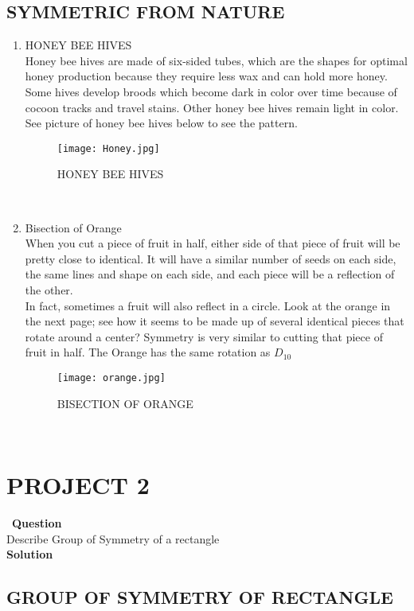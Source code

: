 \documentclass{article}
\begin{document}
\subsection{SYMMETRIC FROM NATURE}
\begin{enumerate}
    \item HONEY BEE HIVES \\
    Honey bee hives are made of six-sided tubes, which are the shapes for optimal honey production because they require less wax and can hold more honey. Some hives develop broods which become dark in color over time because of cocoon tracks and travel stains. Other honey bee hives remain light in color.\\
    See picture of honey bee hives below to see the pattern.\\
    \begin{figure}[htp]
\texttt{[image: Honey.jpg]}
\caption{HONEY BEE HIVES}
\end{figure}\\
\item Bisection of Orange \\
When you cut a piece of fruit in half, either side of that piece of fruit will be pretty close to identical. It will have a similar number of seeds on each side, the same lines and shape on each side, and each piece will be a reflection of the other.\\

In fact, sometimes a fruit will also reflect in a circle. Look at the orange in the next page; see how it seems to be made up of several identical pieces that rotate around a center? Symmetry is very similar to cutting that piece of fruit in half.
The Orange has the same rotation as $D_10$
    \begin{figure}[htp]
\texttt{[image: orange.jpg]}
\caption{BISECTION OF ORANGE}
\end{figure}\\
\end{enumerate}
\vspace{14cm}
\section{PROJECT 2}\
\textbf{Question}\\

Describe Group of Symmetry of a rectangle\\
\textbf{Solution}\\
\subsection{GROUP OF SYMMETRY OF RECTANGLE}
\newcommand{\Rectang}[4]{
\begin{tikzpicture}
\drawGraph{3} 
\draw (-2,1)[] -| node[pos=0,left]{$v_#1$} 
              node[pos=.5,right]{$v_#2$} 
              (2,-1) -|  node[pos=0,right]{$v_#3$}
  node[pos=.5,left]{$v_#4$} cycle;

\end{tikzpicture}
}
\end{document}

